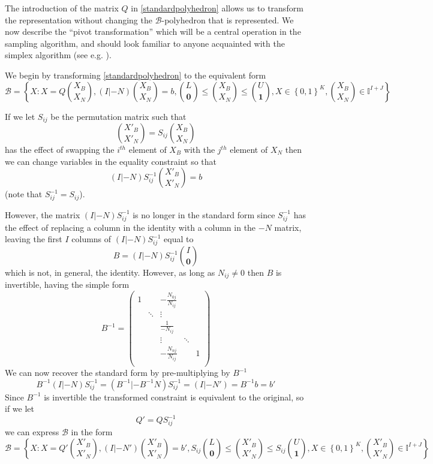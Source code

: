 \documentclass{article}
\begin{document}
The introduction of the matrix $Q$ in \ref{standardpolyhedron} allows us to transform the representation without changing the $\mathcal{B}$-polyhedron that is represented. We now describe the ``pivot transformation'' which will be a central operation in the sampling algorithm, and should look familiar to anyone acquainted with the simplex algorithm (see e.g. \cite{vanderbei2015linear}).

We begin by transforming \ref{standardpolyhedron} to the equivalent form
\begin{equation}
\mathcal{B} = \left\{X: X = Q{X_B\choose X_N}, (I|-N){X_B\choose X_N} = b, {L\choose \mathbf{0}} \le {X_B \choose X_N} \le {U\choose \mathbf{1}}, X \in \left\{ 0,1\right\}^K, {X_B\choose X_N} \in \mathbb{I}^{I+J} \right\}
\label{joinedpolyhedron}
\end{equation}

If we let $S_{ij}$ be the permutation matrix such that
\[
{X'_B\choose X'_N} = S_{ij}{X_B\choose X_N}
\]
has the effect of swapping the $i^{th}$ element of $X_B$ with the $j^{th}$ element of $X_N$ then we can change variables in the equality constraint so that
\[
(I|-N)S^{-1}_{ij}{X'_B \choose X'_N} = b
\]
(note that $S^{-1}_{ij} = S_{ij}$).

However, the matrix $(I|-N)S^{-1}_{ij}$ is no longer in the standard form since $S^{-1}_{ij}$ has the effect of replacing a column in the identity with a column in the $-N$ matrix, leaving the first $I$ columns of $(I|-N)S^{-1}_{ij}$ equal to
\[
B = (I|-N)S^{-1}_{ij}{I \choose \mathbf{0}}
\]
which is not, in general, the identity. However, as long as $N_{ij} \ne 0$ then $B$ is invertible, having the simple form
\[
B^{-1} =  
\begin{pmatrix}
1 &  & -\frac{N_{0j}}{N_{ij}} & & \\
  & \ddots & \vdots & &\\
 & & \frac{1}{-N_{ij}} & &\\
  & & \vdots & \ddots &\\
  & & -\frac{N_{nj}}{N_{ij}} & &1\\
\end{pmatrix}
\]
We can now recover the standard form by pre-multiplying by $B^{-1}$
\[
B^{-1}(I|-N)S^{-1}_{ij} = (B^{-1}|-B^{-1}N)S^{-1}_{ij} = (I|-N') = B^{-1}b  = b'
\]
Since $B^{-1}$ is invertible the transformed constraint is equivalent to the original, so if we let
\[
Q' = QS^{-1}_{ij}
\]
we can express $\mathcal{B}$ in the form
\begin{equation}
\mathcal{B} = \left\{X: X = Q'{X'_B\choose X'_N}, (I|-N'){X'_B\choose X'_N} = b', S_{ij}{L\choose \mathbf{0}} \le {X'_B \choose X'_N} \le S_{ij}{U\choose \mathbf{1}}, X \in \left\{ 0,1\right\}^K, {X'_B\choose X'_N} \in \mathbb{I}^{I+J} \right\}
\end{equation}
\end{document}
